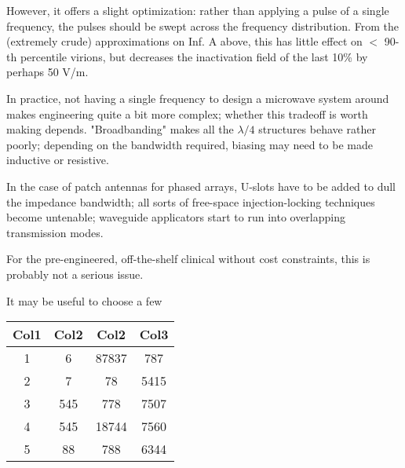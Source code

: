 \documentclass[paper.tex]{subfiles}
\begin{document}
However, it offers a slight optimization: rather than applying a pulse of a single frequency, the pulses should be swept across the frequency distribution. From the (extremely crude) approximations on Inf. A above, this has little effect on $<$ 90-th percentile virions, but decreases the inactivation field of the last 10\% by perhaps 50 V/m.

In practice, not having a single frequency to design a microwave system around makes engineering quite a bit more complex; whether this tradeoff is worth making depends. "Broadbanding" makes all the $\lambda / 4$ structures behave rather poorly; depending on the bandwidth required, biasing may need to be made inductive or resistive.

In the case of patch antennas for phased arrays, U-slots have to be added to dull the impedance bandwidth; all sorts of free-space injection-locking techniques become untenable; waveguide applicators start to run into overlapping transmission modes.

For the pre-engineered, off-the-shelf clinical without cost constraints, this is probably not a serious issue.

It may be useful to choose a few 



\begin{center}
	\begin{tabular}{||c c c c||} 
		\hline
		Col1 & Col2 & Col2 & Col3 \\ [0.5ex] 
		\hline\hline
		1 & 6 & 87837 & 787 \\ 
		\hline
		2 & 7 & 78 & 5415 \\
		\hline
		3 & 545 & 778 & 7507 \\
		\hline
		4 & 545 & 18744 & 7560 \\
		\hline
		5 & 88 & 788 & 6344 \\ [1ex] 
		\hline
	\end{tabular}
\end{center}



	
\end{document}
